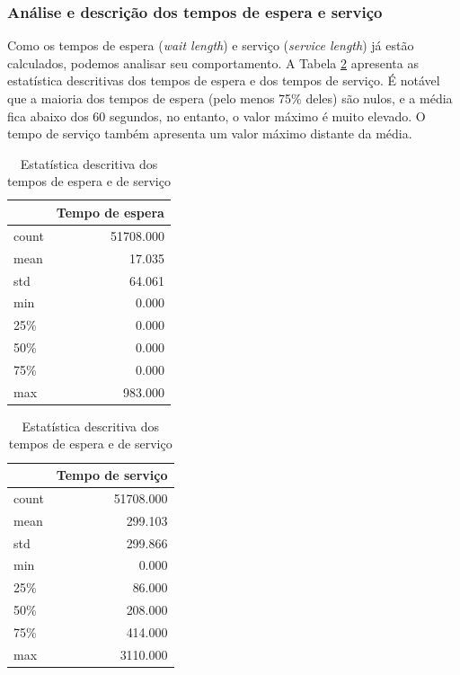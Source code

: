 \subsubsection{Análise e descrição dos tempos de espera e serviço}
Como os tempos de espera (\textit{wait length}) e serviço (\textit{service length}) já estão calculados, podemos analisar seu comportamento. A Tabela \ref*{tab: descricao-serviço-espera} apresenta as estatística descritivas dos tempos de espera e dos tempos de serviço. É notável que a maioria dos tempos de espera (pelo menos 75\% deles) são nulos, e a média fica abaixo dos 60 segundos, no entanto, o valor máximo é muito elevado. O tempo de serviço também apresenta um valor máximo distante da média.

\begin{table}[ht]
\centering
    \begin{tabular}{lr}
            \toprule
            {} &  Tempo de espera \\
            \midrule
            count &   51708.000  \\
            mean  &      17.035  \\
            std   &      64.061  \\
            min   &       0.000  \\
            25\%   &       0.000  \\
            50\%   &       0.000  \\
            75\%   &       0.000  \\
            max   &     983.000  \\
        \bottomrule
    \end{tabular}
    \quad
    \begin{tabular}{lr}
            \toprule
            {} &  Tempo de serviço \\
            \midrule
            count &     51708.000   \\
            mean  &       299.103   \\
            std   &       299.866   \\
            min   &         0.000   \\
            25\%   &        86.000   \\
            50\%   &       208.000   \\
            75\%   &       414.000   \\
            max   &      3110.000   \\
        \bottomrule
    \end{tabular}
    \caption{Estatística descritiva dos tempos de espera e de serviço}
    \label{tab: descricao-serviço-espera}
\end{table}

